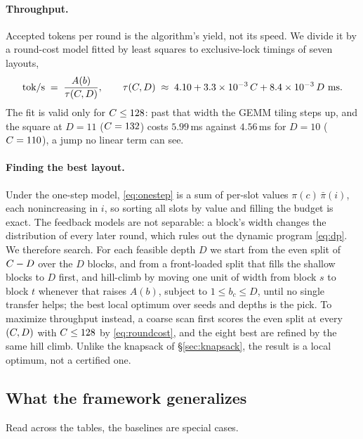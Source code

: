 \documentclass{article} %
\makeatletter
\newenvironment{ai}
  {\color{lightgray}%
   \@ifpackageloaded{caption}{\captionsetup{font={color=lightgray}}}{}%
   \let\ai@savedfloatreset\@floatboxreset
   \g@addto@macro\@floatboxreset{\color{lightgray}}}
  {\global\let\@floatboxreset\ai@savedfloatreset}
\makeatother
\begin{document}
\begin{ai}
\paragraph{Throughput.} Accepted tokens per round is the algorithm's yield, not
its speed. We divide it by a round-cost model fitted by least squares to
exclusive-lock timings of seven layouts,
\begin{equation}
  \text{tok/s} \;=\; \frac{A(b)}{\tau(C, D)},
  \qquad
  \tau(C, D) \;\approx\; 4.10 + 3.3 \times 10^{-3}\,C + 8.4 \times 10^{-3}\, D \ \text{ms}.
  \label{eq:roundcost}
\end{equation}
The fit is valid only for $C \leq 128$: past that width the GEMM tiling
steps up, and the square at $D = 11$ ($C = 132$) costs $5.99$\,ms against
$4.56$\,ms for $D = 10$ ($C = 110$), a jump no linear term can see.

\paragraph{Finding the best layout.} Under the one-step model,
\eqref{eq:onestep} is a sum of per-slot values $\pi(c)\,\bar\pi(i)$, each
nonincreasing in $i$, so sorting all slots by value and filling the budget is
exact. The feedback models are not separable: a block's width changes the
distribution of every later round, which rules out the dynamic program
\eqref{eq:dp}. We therefore search. For each feasible depth $D$ we start from
the even split of $C - D$ over the $D$ blocks, and from a front-loaded
split that fills the shallow blocks to $D$ first, and hill-climb by moving one
unit of width from block $s$ to block $t$ whenever that raises $A(b)$, subject to
$1 \leq b_c \leq D$, until no single transfer helps; the best local optimum over
seeds and depths is the pick. To maximize throughput instead, a coarse scan
first scores the even split at every $(C, D)$ with $C \leq 128$ by
\eqref{eq:roundcost}, and the eight best are refined by the same hill climb.
Unlike the knapsack of \S\ref{sec:knapsack}, the result is a local optimum,
not a certified one.

\subsection{What the framework generalizes}
\label{sec:generalize}

Read across the tables, the baselines are special cases.


\end{ai}
\end{document}
